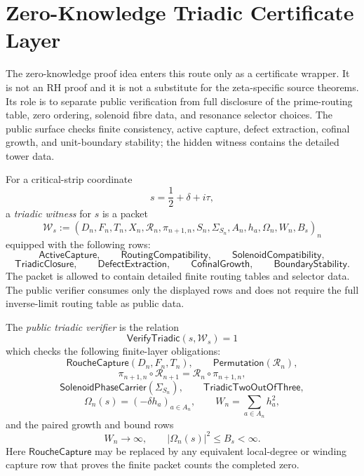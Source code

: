\section{Zero-Knowledge Triadic Certificate Layer}
\label{sec:unified-reality-zero-knowledge-triadic-certificate-layer}

The zero-knowledge proof idea enters this route only as a certificate
wrapper.  It is not an RH proof and it is not a substitute for the
zeta-specific source theorems.  Its role is to separate public
verification from full disclosure of the prime-routing table, zero
ordering, solenoid fibre data, and resonance selector choices.  The
public surface checks finite consistency, active capture, defect
extraction, cofinal growth, and unit-boundary stability; the hidden
witness contains the detailed tower data.

\begin{definition}
\label{def:unified-reality-triadic-witness-completed-zero}
For a critical-strip coordinate
$$
s=\frac12+\delta+i\tau,
$$
a \emph{triadic witness} for $s$ is a packet
$$
\mathcal W_s
:=
(D_n,F_n,T_n,X_n,\mathcal R_n,\pi_{n+1,n},
S_n,\Sigma_{S_n},A_n,h_a,\Omega_n,W_n,B_s)_n
$$
equipped with the following rows:
$$
\mathsf{ActiveCapture},
\qquad
\mathsf{RoutingCompatibility},
\qquad
\mathsf{SolenoidCompatibility},
$$
$$
\mathsf{TriadicClosure},
\qquad
\mathsf{DefectExtraction},
\qquad
\mathsf{CofinalGrowth},
\qquad
\mathsf{BoundaryStability}.
$$
The packet is allowed to contain detailed finite routing tables and
selector data.  The public verifier consumes only the displayed rows and
does not require the full inverse-limit routing table as public data.
\end{definition}

\begin{definition}
\label{def:unified-reality-public-triadic-verifier}
The \emph{public triadic verifier} is the relation
$$
\mathsf{VerifyTriadic}(s,\mathcal W_s)=1
$$
which checks the following finite-layer obligations:
$$
\mathsf{RoucheCapture}(D_n,F_n,T_n),
\qquad
\mathsf{Permutation}(\mathcal R_n),
$$
$$
\pi_{n+1,n}\circ\mathcal R_{n+1}
=
\mathcal R_n\circ\pi_{n+1,n},
$$
$$
\mathsf{SolenoidPhaseCarrier}(\Sigma_{S_n}),
\qquad
\mathsf{TriadicTwoOutOfThree},
$$
$$
\Omega_n(s)=(-\delta h_a)_{a\in A_n},
\qquad
W_n=\sum_{a\in A_n}h_a^2,
$$
and the paired growth and bound rows
$$
W_n\to\infty,
\qquad
|\Omega_n(s)|^2\le B_s<\infty.
$$
Here $\mathsf{RoucheCapture}$ may be replaced by any equivalent
local-degree or winding capture row that proves the finite packet counts
the completed zero.
\end{definition}

